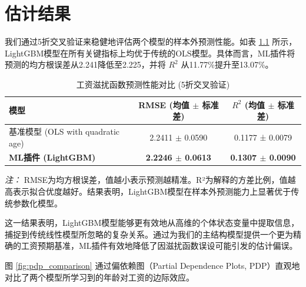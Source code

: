 \documentclass[
  a4paper,
  zihao=-4,
  fontset=mac,
  AutoFakeBold,
  AutoFakeSlant,
  oneside]{ctexbook}
\begin{document}
\chapter{估计结果}


我们通过5折交叉验证来稳健地评估两个模型的样本外预测性能。如表 \ref{tab:ml_performance_comparison} 所示，LightGBM模型在所有关键指标上均优于传统的OLS模型。具体而言，ML插件将预测的均方根误差从2.241降低至2.225，并将 $R^2$ 从11.77\%提升至13.07\%。




\begin{table}[!ht]
\centering
\caption{工资滋扰函数预测性能对比 (5折交叉验证)}
\label{tab:ml_performance_comparison}
\begin{tabular}{lcc}
\toprule
\textbf{模型} & \textbf{RMSE (均值 $\pm$ 标准差)} & \textbf{$R^2$ (均值 $\pm$ 标准差)} \\
\midrule
基准模型 (OLS with quadratic age) & 2.2411 $\pm$ 0.0590 & 0.1177 ± 0.0079 \\
\textbf{ML插件 (LightGBM)} & \textbf{2.2246 $\pm$ 0.0613} & \textbf{0.1307 $\pm$ 0.0090} \\
\bottomrule
\end{tabular}
\vspace{1em}
\begin{minipage}{\linewidth}
\small
\textit{注：} RMSE为均方根误差，值越小表示预测越精准。R²为解释的方差比例，值越高表示拟合优度越好。结果表明，LightGBM模型在样本外预测能力上显著优于传统参数化模型。
\end{minipage}
\end{table}
这一结果表明，LightGBM模型能够更有效地从高维的个体状态变量中提取信息，捕捉到传统线性模型所忽略的复杂关系。通过为我们的主结构模型提供一个更为精确的工资预期基准，ML插件有效地降低了因滋扰函数误设可能引发的估计偏误。





图 \ref{fig:pdp_comparison} 通过偏依赖图（Partial Dependence Plots, PDP）直观地对比了两个模型所学习到的年龄对工资的边际效应。
\end{document}

